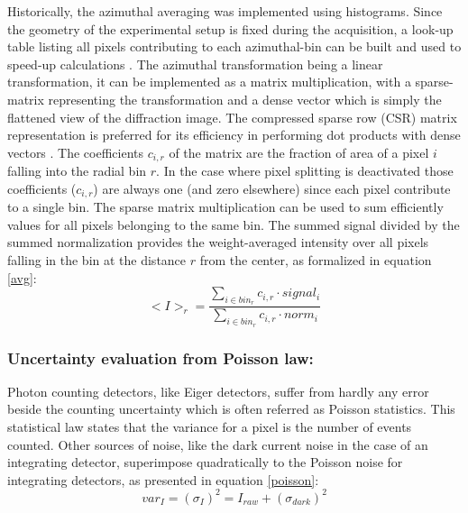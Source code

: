 \documentclass[preprint]{iucr}              %
\begin{document}
Historically, the azimuthal averaging was implemented using histograms. 
Since the geometry of the experimental setup is fixed during the acquisition, a look-up table listing all pixels contributing to each  azimuthal-bin can be built and used to speed-up calculations \cite{pyFAI_gpu}.
The azimuthal transformation being a linear transformation, it can be implemented as a matrix multiplication, with a sparse-matrix representing the transformation and a dense vector which is simply the flattened view of the diffraction image. 
The compressed sparse row (CSR) matrix representation is preferred for its efficiency in performing dot products with dense vectors \cite{SpMV}.
The coefficients $c_{i,r}$ of the matrix are the fraction of area of a pixel $i$ falling into the radial bin $r$.
In the case where pixel splitting is deactivated those coefficients  ($c_{i,r}$) are always one (and zero elsewhere) since each pixel contribute to a single bin.
The sparse matrix multiplication can be used to sum efficiently values for all pixels belonging to the same bin.
The summed signal divided by the summed normalization provides the weight-averaged intensity over all pixels falling in the bin at the distance $r$ from the center, as formalized in equation \ref{avg}: 
\begin{equation}
\label{avg}
<I>_{r} = \frac{\sum\limits_{i \in bin_r} c_{i,r} \cdot signal_i}
                        {\sum\limits_{i \in bin_r} c_{i,r} \cdot norm_i} 
\end{equation}  

\subsubsection{Uncertainty evaluation from Poisson law:}
Photon counting detectors, like Eiger detectors, suffer from hardly any error beside the counting uncertainty which is often referred as Poisson statistics.
This statistical law states that the variance for a pixel is the number of events counted.
Other sources of noise, like the dark current noise in the case of an integrating detector,  superimpose quadratically to the Poisson noise for integrating detectors, as presented in equation \ref{poisson}:     
\begin{equation}
\label{poisson}
var_I = (\sigma_I)^{2} = I_{raw} + (\sigma_{dark})^{2}  
\end{equation}
\end{document}
